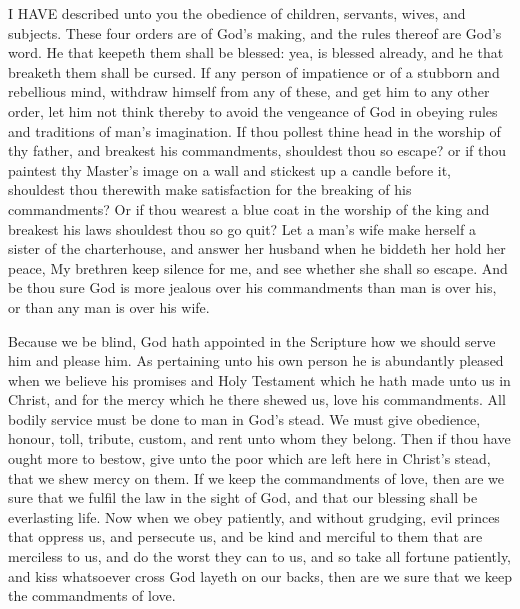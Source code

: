 I HAVE described unto you the obedience of children, 
servants, wives, and subjects. These four orders are of 
God's making, and the rules thereof are God's word. 
He that keepeth them shall be blessed: yea, is blessed 
already, and he that breaketh them shall be cursed. If 
any person of impatience or of a stubborn and rebellious 
mind, withdraw himself from any of these, and get him to 
any other order, let him not think thereby to avoid the 
vengeance of God in obeying rules and traditions of man's 
imagination. If thou pollest thine head in the worship of 
thy father, and breakest his commandments, shouldest thou 
so escape? or if thou paintest thy Master's image on a wall 
and stickest up a candle before it, shouldest thou therewith 
make satisfaction for the breaking of his commandments? 
Or if thou wearest a blue coat in the worship of the king 
and breakest his laws shouldest thou so go quit? Let a man's 
wife make herself a sister of the charterhouse, and answer 
her husband when he biddeth her hold her peace, My 
brethren keep silence for me, and see whether she shall so 
escape. And be thou sure God is more jealous over his 
commandments than man is over his, or than any man is 
over his wife. 

Because we be blind, God hath appointed in the Scripture
how we should serve him and please him. As pertaining
unto his own person he is abundantly pleased when 
we believe his promises and Holy Testament which he 
hath made unto us in Christ, and for the mercy which he 
there shewed us, love his commandments. All bodily 
service must be done to man in God's stead. We must 
give obedience, honour, toll, tribute, custom, and rent 
unto whom they belong. Then if thou have ought more 
to bestow, give unto the poor which are left here in Christ's 
stead, that we shew mercy on them. If we keep the commandments
of love, then are we sure that we fulfil the law 
in the sight of God, and that our blessing shall be everlasting
life. Now when we obey patiently, and without 
grudging, evil princes that oppress us, and persecute us, 
and be kind and merciful to them that are merciless to us, 
and do the worst they can to us, and so take all fortune 
patiently, and kiss whatsoever cross God layeth on our 
backs, then are we sure that we keep the commandments 
of love. 

